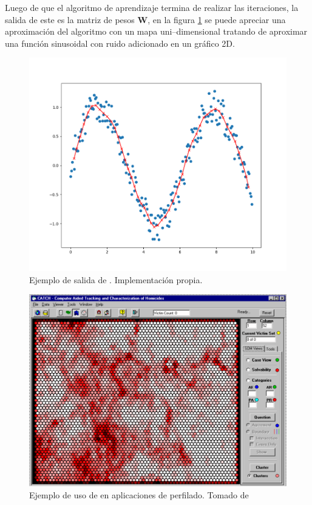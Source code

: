 Luego de que el algoritmo de aprendizaje termina de realizar las iteraciones, la salida de este es la matriz de pesos $\mathbf{W}$, en la figura \ref{fig:som-impl-example} se puede apreciar una aproximación del algoritmo con un mapa uni--dimensional tratando de aproximar una función sinusoidal con ruido adicionado en un gráfico 2D.

\begin{figure}[th]
\centering
\includegraphics[scale=0.5]{Figures/som-implementation-example.png}
\decoRule
\caption[Ejemplo de salida de ]{Ejemplo de salida de . Implementación propia.}
\label{fig:som-impl-example}
\end{figure}

\begin{figure}[th]
\centering
\includegraphics[scale=0.3]{Figures/som-example.png}
\decoRule
\caption[Ejemplo de uso de  en aplicaciones de perfilado]{Ejemplo de uso de  en aplicaciones de perfilado. Tomado de \cite{mena2003investigative}}
\label{fig:som-example}
\end{figure}

